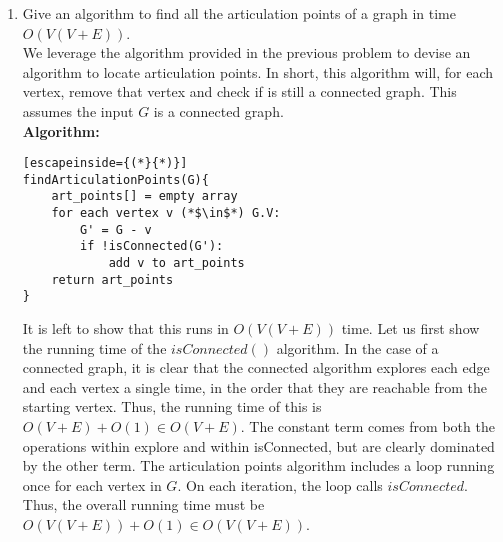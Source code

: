 \documentclass{article}
\begin{document}
\begin{enumerate}
\begin{enumerate}
\begin{lstlisting}[escapeinside={(*}{*)}]
explore(G,v){
	visited(v) = true
	add v to seen
	for each edge(v,u)(*$\in$*) G.E:
		if not visited(u):
			explore(u)
}
		\end{lstlisting}
This algorithm simply explores the graph $G$ starting at any vertex in $V$, and returns true if all other vertices are reachable from that arbitrary vertex. As this graph is undirected, if is enough to check one single vertex, as any path $v,u$ in the graph is reflexive giving us path $u,v$. Thus, all nodes $u$ reachable by one node $v$ are also reachable by each of the nodes $u$.
		\item Give an algorithm to find all the articulation points of a graph in time $O(V(V+E))$.
		\\ We leverage the algorithm provided in the previous problem to devise an algorithm to locate articulation points. In short, this algorithm will, for each vertex, remove that vertex and check if is still a connected graph. This assumes the input $G$ is a connected graph.
		\\ \textbf{Algorithm:}
		\begin{lstlisting}[escapeinside={(*}{*)}]
findArticulationPoints(G){
	art_points[] = empty array
	for each vertex v (*$\in$*) G.V:
		G' = G - v
		if !isConnected(G'):
			add v to art_points
	return art_points	
}
		\end{lstlisting}
	It is left to show that this runs in $O(V(V+E))$ time. Let us first show the running time of the $isConnected()$ algorithm. In the case of a connected graph, it is clear that the connected algorithm explores each edge and each vertex a single time, in the order that they are reachable from the starting vertex. Thus, the running time of this is $O(V+E)+O(1)\in O(V+E)$. The constant term comes from both the operations within explore and within isConnected, but are clearly dominated by the other term. The articulation points algorithm includes a loop running once for each vertex in $G$. On each iteration, the loop calls $isConnected$. Thus, the overall running time must be $O(V(V+E))+O(1)\in O(V(V+E))$.


\end{enumerate}
\end{enumerate}
\end{document}
